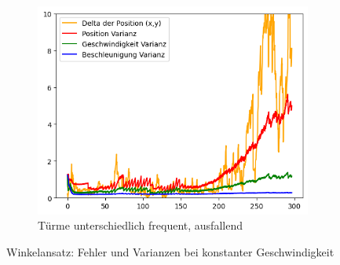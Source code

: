 \begin{figure}
\begin{subfigure}{.333\textwidth}
        \includegraphics[width=.9\linewidth]{Ergebnisse/plots_ungenauigkeiten/winkel/winkel_const_vel_flag_freq.png}
        \caption{Türme unterschiedlich frequent, ausfallend}
    \end{subfigure}
    \caption{Winkelansatz: Fehler und Varianzen bei konstanter Geschwindigkeit}
    \label{abb:winkel-cv-fehler}
\end{figure}

